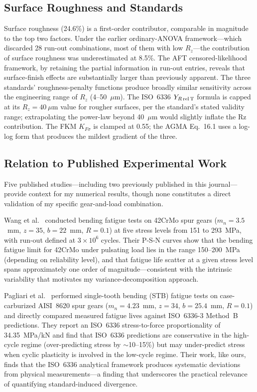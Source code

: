 \documentclass[12pt,a4paper]{article}
\begin{document}
\subsection{Surface Roughness and Standards}

Surface roughness (24.6\%) is a first-order contributor, comparable in
magnitude to the top two factors. Under the earlier ordinary-ANOVA
framework---which discarded 28 run-out combinations, most of them with
low $R_z$---the contribution of surface roughness was underestimated at
8.5\%. The AFT censored-likelihood framework, by retaining the partial
information in run-out entries, reveals that surface-finish effects are
substantially larger than previously apparent. The three standards'
roughness-penalty functions produce broadly similar sensitivity across
the engineering range of $R_z$ (4--50~$\mu$m). The ISO~6336
$Y_{R\,\rm rel\,T}$ formula is capped at its $R_z=40~\mu$m value for
rougher surfaces, per the standard's stated validity range; extrapolating
the power-law beyond 40~$\mu$m would slightly inflate the Rz contribution.
The FKM $K_{F\sigma}$ is clamped at 0.55; the AGMA Eq.~16.1 uses a
log-log form that produces the mildest gradient of the three.

\subsection{Relation to Published Experimental Work}

Five published studies---including two previously published in
this journal---provide context for my numerical results, though
none constitutes a direct validation of my specific
gear-and-load combination.

Wang et al.~\cite{wang2023} conducted bending fatigue tests on 42CrMo
spur gears ($m_n{=}3.5$~mm, $z{=}35$, $b{=}22$~mm, $R{=}0.1$) at five
stress levels from 151 to 293~MPa, with run-out defined at $3\times10^6$
cycles. Their P-S-N curves show that the bending fatigue limit for
42CrMo under pulsating load lies in the range 150--200~MPa (depending on
reliability level), and that fatigue life scatter at a given stress level
spans approximately one order of magnitude---consistent with the
intrinsic variability that motivates my variance-decomposition approach.

Pagliari et al.~\cite{pagliari2025} performed single-tooth bending (STB)
fatigue tests on case-carburized AISI~8620 spur gears
($m_n{=}4.23$~mm, $z{=}34$, $b{=}25.4$~mm, $R{=}0.1$) and directly
compared measured fatigue lives against ISO~6336-3 Method~B predictions.
They report an ISO~6336 stress-to-force proportionality of
34.35~MPa/kN and find that ISO~6336 predictions are conservative in the
high-cycle regime (over-predicting stress by $\sim$10--15\%) but may
under-predict stress when cyclic plasticity is involved in the low-cycle
regime. Their work, like ours, finds that the ISO~6336 analytical
framework produces systematic deviations from physical measurements---a
finding that underscores the practical relevance of quantifying
standard-induced divergence.
\end{document}
